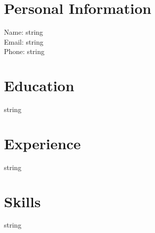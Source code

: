 \documentclass{article}
\begin{document}
\section*{Personal Information}
Name: string \\
Email: string \\
Phone: string \\

\section*{Education}
string

\section*{Experience}
string

\section*{Skills}
string
\end{document}
